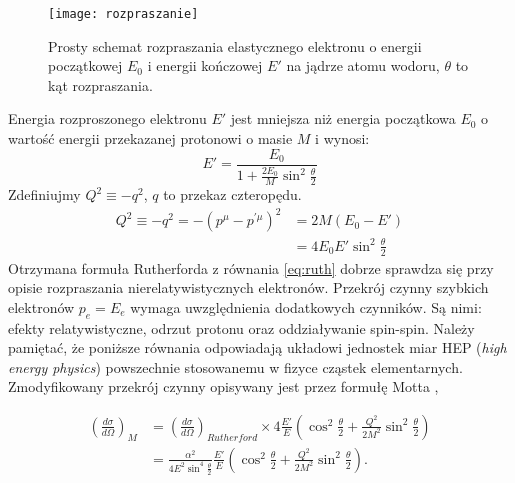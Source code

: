 \documentclass[11pt]{book}
\theoremstyle{definition}
\begin{document}
\begin{figure}[htp!]
	\centering
	\texttt{[image: rozpraszanie]}
	\caption{Prosty schemat rozpraszania elastycznego elektronu o energii początkowej $E_0$  i energii kończowej $E'$ na jądrze atomu wodoru, $\theta$ to kąt rozpraszania.}
	\label{fig:scactter}
\end{figure}
%
Energia rozproszonego elektronu $E'$ jest mniejsza niż energia początkowa $E_0$ o wartość energii przekazanej protonowi o masie $M$ i wynosi:
%
\begin{equation}
E' = \frac{E_0}{1 + \frac{2E_0}{M}\sin^2 \frac{\theta}{2}}
\end{equation}
%
Zdefiniujmy $ Q^2 \equiv - q^2 $, $q$ to przekaz czteropędu.
%
\begin{equation}
\begin{split}
Q^2 \equiv - q^2 = -(p^{\mu} - p^{'\mu})^2 &= 2M\left(E_0 - E'\right) \\
& = 4 E_0 E' \sin^2 \frac{\theta}{2}
\end{split}
\end{equation}
%
Otrzymana formuła Rutherforda z równania \ref{eq:ruth} dobrze sprawdza się przy opisie rozpraszania nierelatywistycznych elektronów. Przekrój czynny szybkich elektronów $p_e = E_e$ wymaga uwzględnienia dodatkowych czynników. Są nimi: efekty relatywistyczne, odrzut protonu oraz oddziaływanie spin-spin. Należy pamiętać, że poniższe równania odpowiadają układowi jednostek miar HEP (\textit{high energy physics}) powszechnie stosowanemu w fizyce cząstek elementarnych. Zmodyfikowany przekrój czynny opisywany jest przez formułę Motta \cite{10.1088/978-0-7503-1140-3}, 



\begin{equation}
\begin{split}
\left( \frac{d\sigma}{d\Omega} \right)_M  &= \left( \frac{d\sigma}{d\Omega} \right)_{Rutherford} \times 4\frac{E'}{E}\left( \cos^2 \frac{\theta}{2} + \frac{Q^2}{2M^2}\sin^2\frac{\theta}{2}\right) \\ 
& =  \frac{\alpha^2 }{4E^2\sin^4 \frac{\theta}{2}} \frac{E'}{E} \left( \cos^2 \frac{\theta}{2} + \frac{Q^2}{2M^2}\sin^2\frac{\theta}{2}\right). \label{eq:mott}
\end{split}
\end{equation}
\end{document}
